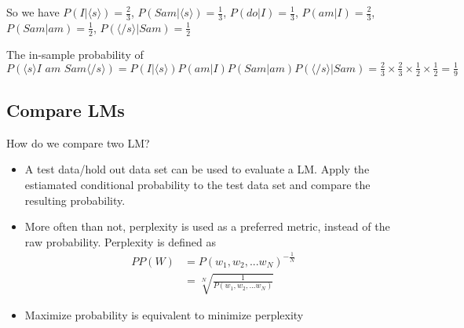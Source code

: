 \documentclass[12pt, oneside]{article}
\begin{document}
\vspace{0.2cm}

So we have $P(I|\langle s \rangle)=\frac{2}{3}$, $P(Sam|\langle s \rangle)=\frac{1}{3}$, $P(do|I)=\frac{1}{3}$, $P(am|I)=\frac{2}{3}$, $P(Sam|am)=\frac{1}{2}$, $P(\langle /s\rangle | Sam)=\frac{1}{2}$

\vspace{0.2cm}

The in-sample probability of $P(\langle s \rangle \textit{I am Sam}\langle /s\rangle)=P(I|\langle s \rangle)P(am|I)P(Sam|am)P(\langle /s\rangle | Sam)=\frac{2}{3} \times \frac{2}{3} \times \frac{1}{2} \times \frac{1}{2}=\frac{1}{9}$

\subsection{Compare LMs}
How do we compare two LM?
\begin{itemize}
\item A test data/hold out data set can be used to evaluate a LM. Apply the estiamated conditional probability to the test data set and compare the resulting probability.
\item More often than not, perplexity is used as a preferred metric, instead of the raw probability. Perplexity is defined as 
\begin{align*}
	PP(W)&=P(w_1, w_2, ...w_N)^{-\frac{1}{N}}\\
	&=\sqrt[N]{\frac{1}{P(w_1, w_2, ...w_N)}}
\end{align*}
\item Maximize probability is equivalent to minimize perplexity

\end{itemize}
\end{document}
